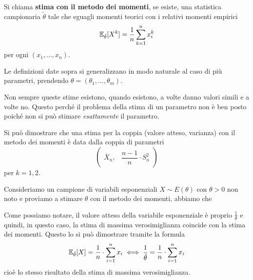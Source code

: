 \begin{definition}
	Si chiama \textbf{stima con il metodo dei momenti}, se esiste, una statistica campionaria
	$\tilde{\theta}$ tale che eguagli momenti teorici con i relativi momenti empirici
	\[ \mathbb{E}_{\tilde{\theta}} [X^k] = \frac{1}{n} \sum_{k=1}^{n} x_i^k \]
	per ogni $(x_1, \dots, x_n)$.
\end{definition}

\begin{observation}
	Le definizioni date sopra si generalizzano in modo naturale al caso di più parametri, prendendo
	$\theta = (\theta_1, \dots, \theta_m)$.
\end{observation}

\begin{observation}
	Non sempre queste stime esistono, quando esistono, a volte danno valori simili e a volte no.
	Questo perché il problema della stima di un parametro non è ben posto poiché non si può stimare
	\emph{esattamente} il parametro.
\end{observation}

Si può dimostrare che una stima per la coppia (valore atteso, varianza) con il metodo dei momenti
è data dalla coppia di parametri
\[ \begin{pmatrix} \overline{X}_n, & \dfrac{n-1}{n} \cdot S_n^2 \end{pmatrix} \]
per $k = 1, 2$.

\begin{example}
	Consideriamo un campione di variabili esponenziali $X \sim E(\theta)$ con $\theta > 0$ non noto
	e proviamo a stimare $\theta$ con il metodo dei momenti, abbiamo che

	Come possiamo notare, il valore atteso della variabile esponenziale è proprio
	$\frac{1}{\theta}$ e quindi, in questo caso, la stima di massima verosimiglianza coincide con
	la stima dei momenti. Questo lo si può dimostrare tramite la formula
	\[
		\mathbb{E}_{\tilde{\theta}} [X] = \frac{1}{n} \cdot \sum_{i=1}^n x_i \iff
		\frac{1}{\hat{\theta}} = \frac{1}{n} \cdot \sum_{i=1}^n x_i
	\]
	cioè lo stesso risultato della stima di massima verosimiglianza.
\end{example}

